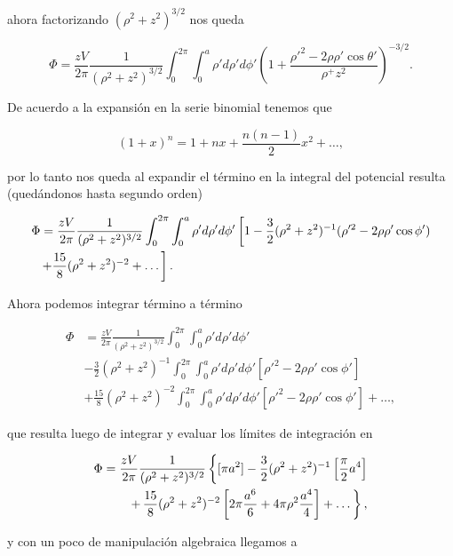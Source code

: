 \documentclass[a4paper,11pt]{article}
\numberwithin{equation}{section}
\newcommand{\zerodel}{.\kern-\nulldelimiterspace}
\begin{document}
ahora factorizando $(\rho^2 + z^2)^{3/2}$ nos queda 

\begin{equation}
 \Phi = \frac{zV}{2\pi}\frac{1}{(\rho^2 + z^2)^{3/2}} 
 \int_0^{2\pi}\int_0^a  \rho'd\rho'd\phi' 
 \left(1 + \frac{\rho'^2 - 2\rho\rho'\cos{\theta'}}{\rho^+z^2}\right)^{-3/2}.
\end{equation}

De acuerdo a la expansión en la serie binomial tenemos que 

\begin{equation}
 (1 + x)^n = 1 + nx + \frac{n(n-1)}{2}x^2 + \dots,
\end{equation}

por lo tanto nos queda al expandir el término en la integral del 
potencial resulta (quedándonos hasta segundo orden)

\begin{align*}
 \Phi &= \frac{zV}{2\pi}\frac{1}{(\rho^2 + z^2)^{3/2}} \int_0^{2\pi} 
 \int_0^a \rho'd\rho'd\phi' \left[1 - \frac{3}{2}(\rho^2 + z^2)^{-1} 
 (\rho'^2 - 2\rho\rho'\cos{\phi'})\right\zerodel \\
 &\left\zerodel + \frac{15}{8}(\rho^2 + z^2)^{-2} + \dots \right].
\end{align*}

Ahora podemos integrar término a término 

\begin{align*}
 \Phi &= \frac{zV}{2\pi}\frac{1}{(\rho^2 + z^2)^{3/2}}\int_0^{2\pi}
 \int_0^a \rho'd\rho'd\phi' \\
 &- \frac{3}{2}(\rho^2 + z^2)^{-1} 
 \int_0^{2\pi} \int_0^a \rho'd\rho'd\phi' [\rho'^2 - 2\rho\rho'\cos{\phi}'] \\
 &+ \frac{15}{8}(\rho^2 + z^2)^{-2} 
 \int_0^{2\pi}\int_0^a \rho'd\rho'd\phi' [\rho'^2 - 2\rho\rho'\cos{\phi}']
 + \dots,
\end{align*}

que resulta luego de integrar y evaluar los límites de integración 
en 

\begin{align*}
  \Phi = \frac{zV}{2\pi} \frac{1}{(\rho^2 + z^2)^{3/2}}\left\{[\pi a^2] - 
 \frac{3}{2}(\rho^2 + z^2)^{-1}\left[\frac{\pi}{2}a^4 \right]\right\zerodel \\
 + \left\zerodel \frac{15}{8}(\rho^2 + z^2)^{-2}\left[2\pi\frac{a^6}{6} + 
 4\pi\rho^2\frac{a^4}{4}\right] + \dots \right\},
\end{align*}

y con un poco de manipulación algebraica llegamos a 
\end{document}

